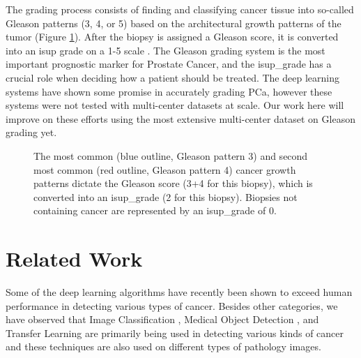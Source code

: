 \documentclass[10pt,twocolumn,letterpaper]{article}
\begin{document}
The grading process consists of finding and classifying cancer tissue into so-called Gleason patterns (3, 4, or 5) based on the architectural growth patterns of the tumor (Figure \ref{fig:gleason_grading_process}). After the biopsy is assigned a Gleason score, it is converted into an isup grade on a 1-5 scale \cite{Authors01}. The Gleason grading system is the most important prognostic marker for Prostate Cancer, and the isup\_grade has a crucial role when deciding how a patient should be treated. The deep learning systems have shown some promise in accurately grading PCa, however these systems were not tested with multi-center datasets at scale. Our work here will improve on these efforts using the most extensive multi-center dataset on Gleason grading yet.


\begin{figure}[t]
\begin{center}
\end{center}
   \caption{The most common (blue outline, Gleason pattern 3) and second most common (red outline, Gleason pattern 4) cancer growth patterns dictate the Gleason score (3+4 for this biopsy), which is converted into an isup\_grade (2 for this biopsy). Biopsies not containing cancer are represented by an isup\_grade of 0.}
\label{fig:gleason_grading_process}
\end{figure}

\section{Related Work}
Some of the deep learning algorithms have recently been shown to exceed human performance in detecting various types of cancer. Besides other categories, we have observed that Image Classification \cite{8861376} \cite{nazeri2018two} \cite{Shen_2019} \cite{wei2019pathologist} \cite{Amartya}, Medical Object Detection \cite{ribli2018detecting} \cite{liu2017detecting} \cite{tomita2019attention}, and Transfer Learning \cite{levy2016breast} \cite{kassani2019breast}  are primarily being used in detecting various kinds of cancer and these techniques are also used on different types of pathology images.
\end{document}
